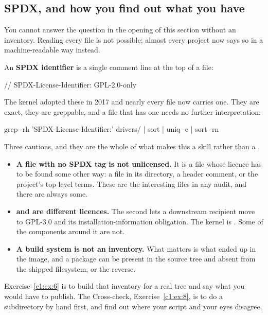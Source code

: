 \subsection{SPDX, and how you find out what you have}
\label{c1:app:b6}

You cannot answer the question in the opening of this section without an inventory. Reading every
file is not possible; almost every project now says so in a machine-readable way instead.

An \textbf{SPDX identifier} is a single comment line at the top of a file:

\begin{ccode}
// SPDX-License-Identifier: GPL-2.0-only
\end{ccode}

\noindent The kernel adopted these in 2017 and nearly every file now carries one. They are exact,
they are greppable, and a file that has one needs no further interpretation:

\begin{shell}
grep -rh 'SPDX-License-Identifier:' drivers/ | sort | uniq -c | sort -rn
\end{shell}

\noindent Three cautions, and they are the whole of what makes this a skill rather than a
.
\begin{itemize}
  \item \textbf{A file with no SPDX tag is not unlicensed.} It is a file whose licence has to be
    found some other way: a  file in its directory, a header comment, or the project's
    top-level terms. These are the interesting files in any audit, and there are always some.
  \item \textbf{ and  are different licences.} The second
    lets a downstream recipient move to GPL-3.0 and its installation-information obligation. The
    kernel is . Some of the components around it are not.
  \item \textbf{A build system is not an inventory.} What matters is what ended up in the image, and
    a package can be present in the source tree and absent from the shipped filesystem, or the
    reverse.
\end{itemize}
Exercise~\ref{c1:ex:6} is to build that inventory for a real tree and say what you would have to
publish. The Cross-check, Exercise~\ref{c1:ex:8}, is to do a subdirectory by hand first, and find
out where your script and your eyes disagree.

